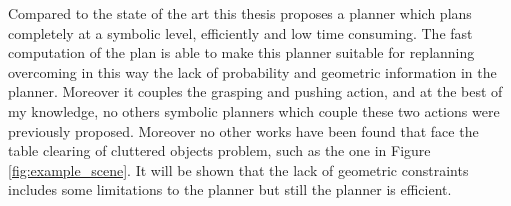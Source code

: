 
\mbox{} 

Compared to the state of the art this thesis proposes a planner which plans completely at a symbolic level, efficiently and low time consuming. The fast computation of the plan is able to make this planner suitable for replanning overcoming in this way the lack of probability and geometric information in the planner. Moreover it couples the grasping and pushing action, and at the best of my knowledge, no others symbolic planners which couple these two actions were previously proposed. Moreover no other works have been found that face the table clearing of cluttered objects problem, such as the one in Figure \ref{fig:example_scene}. It will be shown that the lack of geometric constraints includes some limitations to the planner but still the planner is efficient.  




